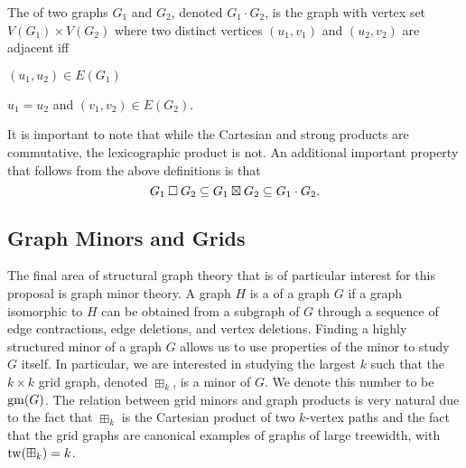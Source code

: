 \documentclass[../main.tex]{subfiles}
\begin{document}
The  of two graphs $G_1$ and $G_2$, denoted $G_1 \cdot G_2$, is the graph with vertex set $V(G_1) \times V(G_2)$ where two distinct vertices $(u_1, v_1)$ and $(u_2, v_2)$ are adjacent iff
\begin{compactitem}
	\item $(u_1, u_2) \in E(G_1)$
	\item $u_1 = u_2$ and $(v_1, v_2) \in E(G_2)$.
\end{compactitem}

It is important to note that while the Cartesian and strong products are commutative, the lexicographic product is not. An additional important property that follows from the above definitions is that $$G_1\mathbin{\Box} G_2 \subseteq G_1\boxtimes G_2 \subseteq G_1 \cdot G_2.$$


\subsection{Graph Minors and Grids}
The final area of structural graph theory that is of particular interest for this proposal is graph minor theory. A graph $H$ is a  of a graph $G$ if a graph isomorphic to $H$ can be obtained from a subgraph of $G$ through a sequence of edge contractions, edge deletions, and vertex deletions. Finding a highly structured minor of a graph $G$ allows us to use properties of the minor to study $G$ itself. In particular, we are interested in studying the largest $k$ such that the $k\times k$ grid graph, denoted $\boxplus_k$, is a minor of $G$. We denote this number to be $\operatorname{gm}(G)$. The relation between grid minors and graph products is very natural due to the fact that $\boxplus_k$ is the Cartesian product of two $k$-vertex paths and the fact that the grid graphs are canonical examples of graphs of large treewidth, with $\operatorname{tw}(\boxplus_k)=k$.

	
	
\end{document}
